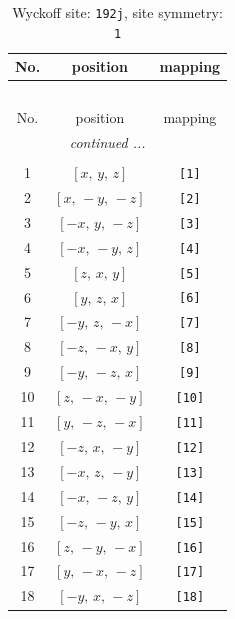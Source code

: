 \documentclass[fleqn,8pt]{jsarticle}
\begin{document}
\begin{longtable}{ccc}
\caption{Wyckoff site: {\tt 192j}, site symmetry: {\tt 1}}
 \\
 \hline \hline
No. & position & mapping \\ \hline \endfirsthead

\multicolumn{2}{l}{\tablename\ \thetable{}} \\
 \hline \hline
No. & position & mapping \\ \hline \endhead

 \hline \hline
\multicolumn{2}{r}{\footnotesize\it continued ...} \\ \endfoot

 \hline \hline
\multicolumn{2}{r}{} \\ \endlastfoot

1 & $\left[ x,\, y,\, z \right]$ & {\tt [1]} \\ \hline
2 & $\left[ x,\, - y,\, - z \right]$ & {\tt [2]} \\ \hline
3 & $\left[ - x,\, y,\, - z \right]$ & {\tt [3]} \\ \hline
4 & $\left[ - x,\, - y,\, z \right]$ & {\tt [4]} \\ \hline
5 & $\left[ z,\, x,\, y \right]$ & {\tt [5]} \\ \hline
6 & $\left[ y,\, z,\, x \right]$ & {\tt [6]} \\ \hline
7 & $\left[ - y,\, z,\, - x \right]$ & {\tt [7]} \\ \hline
8 & $\left[ - z,\, - x,\, y \right]$ & {\tt [8]} \\ \hline
9 & $\left[ - y,\, - z,\, x \right]$ & {\tt [9]} \\ \hline
10 & $\left[ z,\, - x,\, - y \right]$ & {\tt [10]} \\ \hline
11 & $\left[ y,\, - z,\, - x \right]$ & {\tt [11]} \\ \hline
12 & $\left[ - z,\, x,\, - y \right]$ & {\tt [12]} \\ \hline
13 & $\left[ - x,\, z,\, - y \right]$ & {\tt [13]} \\ \hline
14 & $\left[ - x,\, - z,\, y \right]$ & {\tt [14]} \\ \hline
15 & $\left[ - z,\, - y,\, x \right]$ & {\tt [15]} \\ \hline
16 & $\left[ z,\, - y,\, - x \right]$ & {\tt [16]} \\ \hline
17 & $\left[ y,\, - x,\, - z \right]$ & {\tt [17]} \\ \hline
18 & $\left[ - y,\, x,\, - z \right]$ & {\tt [18]} \\ \hline

\end{longtable}
\end{document}
